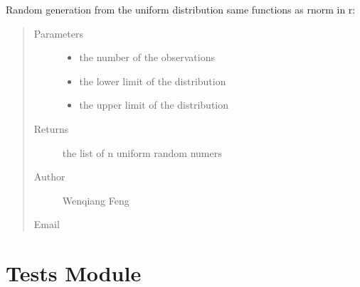 \documentclass[letterpaper,12pt,english]{sphinxmanual}
\begin{document}
\begin{fulllineitems}
\sphinxAtStartPar
Random generation from the uniform distribution
same functions as rnorm in r: 
\begin{quote}\begin{description}
\item[{Parameters}] \leavevmode\begin{itemize}
\item {} 
\sphinxAtStartPar
{} \textendash{} the number of the observations

\item {} 
\sphinxAtStartPar
{} \textendash{} the lower limit of the distribution

\item {} 
\sphinxAtStartPar
{} \textendash{} the upper limit of the distribution

\end{itemize}

\item[{Returns}] \leavevmode
\sphinxAtStartPar
the list of n uniform random numers

\item[{Author}] \leavevmode
\sphinxAtStartPar
Wenqiang Feng

\item[{Email}] \leavevmode
\sphinxAtStartPar
{}

\end{description}\end{quote}

\end{fulllineitems}



\section{Tests Module}
\label{\detokenize{api:tests-module}}

\subsection{}
\label{\detokenize{api:module-statspy.tests}}\label{\detokenize{api:t-test}}
\end{document}
